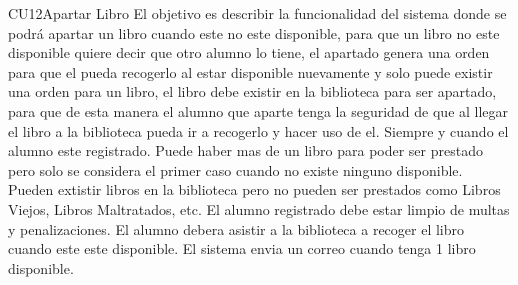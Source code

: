 
	\begin{UseCase}{CU12}{Apartar Libro}{
		El objetivo es describir la funcionalidad del sistema donde se podrá apartar un libro cuando este no este disponible, para que un libro no este disponible quiere decir que otro alumno lo tiene, el apartado genera una orden para que el pueda recogerlo al estar disponible nuevamente y solo puede existir una orden para un libro, el libro debe existir en la biblioteca para ser apartado, para que de esta manera el alumno que aparte tenga la seguridad de que al llegar el libro a la biblioteca pueda ir a recogerlo y hacer uso de el. Siempre y cuando el alumno este registrado. Puede haber mas de un libro para poder ser prestado pero solo se considera el primer caso cuando no existe ninguno disponible. Pueden extistir libros en la biblioteca pero no pueden ser prestados como Libros Viejos, Libros Maltratados, etc. El alumno registrado debe estar limpio de multas y penalizaciones. El alumno debera asistir a la biblioteca a recoger el libro cuando este este disponible. El sistema envia un correo cuando tenga 1 libro disponible.
	}
		
		

\end{UseCase}
